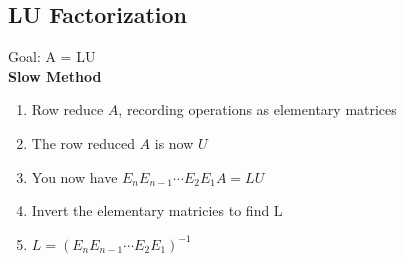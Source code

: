\documentclass[10pt]{article}
\begin{document}
\pagebreak

\subsection*{LU Factorization}
Goal: A = LU \\
\textbf{Slow Method}
\begin{enumerate}
    \item Row reduce \(A\), recording operations as elementary matrices
    \item The row reduced \(A\) is now \(U\)
    \item You now have \(E_n E_{n-1} \cdots E_2 E_1 A = LU\)
    \item Invert the elementary matricies to find L
    \item \(L = (E_n E_{n-1} \cdots E_2 E_1) ^ {-1}\)
\end{enumerate}
\end{document}
